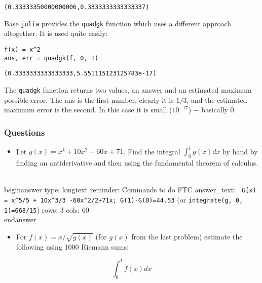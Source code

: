 \documentclass[12pt]{article}
\begin{document}
\begin{verbatim}
(0.33333350000000006,0.3333333333333337)\end{verbatim}
\newline
Base \texttt{julia} provides the \texttt{quadgk} function which uses a different approach altogether. It is used quite easily:\begin{verbatim}
f(x) = x^2
ans, err = quadgk(f, 0, 1)
\end{verbatim}
\begin{verbatim}
(0.3333333333333333,5.551115123125783e-17)\end{verbatim}
\newline
The \texttt{quadgk} function returns two values, an answer and an estimated maximum possible error.  The ans is the first number, clearly it is $1/3$, and the estimated maximum error is the second. In this case it is small ($10^{-17}$) $-$ basically 0.\subsubsection{Questions}\begin{itemize}\item Let $g(x) = x^4 + 10x^2 - 60x + 71$. Find the integral $\int_0^1   g(x) dx$ by hand by finding an antiderivative and then using the fundamental theorem of calculus.\end{itemize}
\\begin{answer}
type: longtext
reminder: Commands to do FTC
answer_text: \verb# G(x) = x^5/5 + 10x^3/3 -60x^2/2+71x; G(1)-G(0)=44.53# (or \verb#integrate(g, 0, 1)=668/15#) 
rows: 3
cols: 60
\\end{answer}
\begin{itemize}\item For $f(x) = x/\sqrt{g(x)}$ (for $g(x)$ from the last problem) estimate the following using 1000 Riemann sums:\end{itemize}
$$
\int_0^1 f(x) dx
$$
\end{document}

